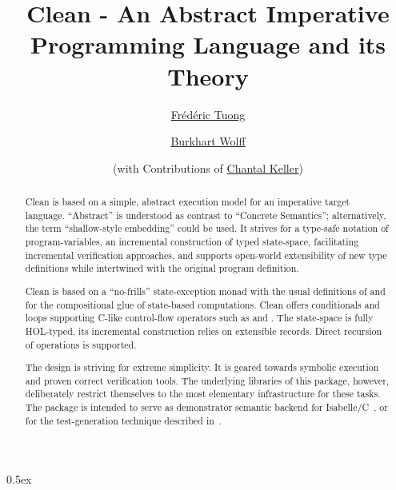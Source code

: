 \documentclass[fontsize=11pt,paper=a4,open=right,twoside,abstract=true]{scrreprt}
\newcommand{\HOL}{HOL}
\begin{document}
\title{Clean - An Abstract Imperative Programming Language and its Theory}
\author{%
  \href{https://www.lri.fr/~ftuong/}{Fr\'ed\'eric Tuong}
  \and
  \href{https://www.lri.fr/~wolff/}{Burkhart Wolff} \\
  \and
  (with Contributions of \href{https://www.lri.fr/~keller/}{Chantal Keller})}
\publishers{%
  \mbox{LRI, Univ. Paris-Sud, CNRS, Universit\'e Paris-Saclay} \\
  b\^at. 650 Ada Lovelace, 91405 Orsay, France \texorpdfstring{\\}{}
}

\maketitle

\begin{abstract}
Clean is based on a simple, abstract execution model for an imperative target language. ``Abstract''
is understood as contrast to ``Concrete Semantics''; alternatively, the term ``shallow-style
embedding'' could be used. It strives for a type-safe notation of program-variables, an incremental
construction of typed state-space, facilitating incremental verification approaches, and supports
open-world extensibility of new type definitions while intertwined with the original program
definition.

Clean is based on a ``no-frills'' state-exception monad with the usual definitions of  and
 for the compositional glue of state-based computations. Clean offers conditionals and
loops supporting C-like control-flow operators such as  and . The state-space
is fully \HOL{}-typed, its incremental construction relies on extensible records. Direct recursion
of operations is supported.

The design is striving for extreme simplicity. It is geared towards symbolic execution and proven
correct verification tools. The underlying libraries of this package, however, deliberately restrict
themselves to the most elementary infrastructure for these tasks. The package is intended to serve
as demonstrator semantic backend for Isabelle/C~\cite{TuongWolff19}, or for the test-generation
technique described in~\cite{DBLP:conf/tap/Keller18}.
\end{abstract}

\newpage
\tableofcontents

\parindent 0pt\parskip 0.5ex

% 
\newpage

\end{document}
